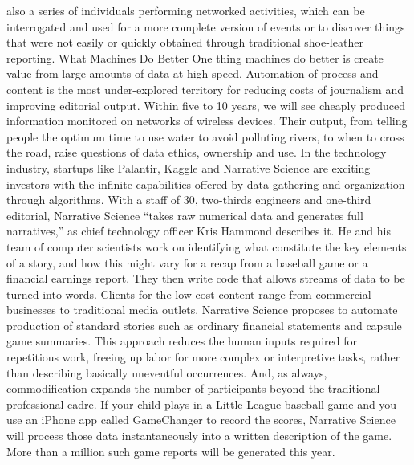 also a series of individuals performing networked activities, which can be interrogated
and used for a more complete version of events or to discover things that
were not easily or quickly obtained through traditional shoe-leather reporting.
What Machines Do Better
One thing machines do better is create value from large amounts of data at high
speed. Automation of process and content is the most under-explored territory
for reducing costs of journalism and improving editorial output. Within five to
10 years, we will see cheaply produced information monitored on networks
of wireless devices. Their output, from telling people the optimum time to use
water to avoid polluting rivers, to when to cross the road, raise questions of data
ethics, ownership and use.
In the technology industry, startups like Palantir, Kaggle and Narrative Science
are exciting investors with the infinite capabilities offered by data gathering and
organization through algorithms.
With a staff of 30, two-thirds engineers and one-third editorial, Narrative
Science ``takes raw numerical data and generates full narratives,'' as chief
technology officer Kris Hammond describes it. He and his team of computer
scientists work on identifying what constitute the key elements of a story, and
how this might vary for a recap from a baseball game or a financial earnings
report. They then write code that allows streams of data to be turned into
words. Clients for the low-cost content range from commercial businesses to
traditional media outlets.
Narrative Science proposes to automate production of standard stories such as
ordinary financial statements and capsule game summaries. This approach reduces
the human inputs required for repetitious work, freeing up labor for more complex
or interpretive tasks, rather than describing basically uneventful occurrences.
And, as always, commodification expands the number of participants beyond the
traditional professional cadre. If your child plays in a Little League baseball game
and you use an iPhone app called GameChanger to record the scores, Narrative
Science will process those data instantaneously into a written description of the
game. More than a million such game reports will be generated this year.

